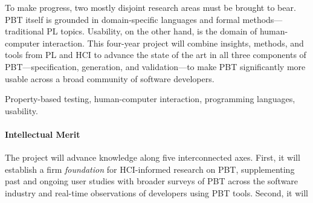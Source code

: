 

To make progress, two mostly disjoint research areas
must be brought to bear.  PBT itself is grounded in domain-specific
languages and formal methods---traditional PL topics.  Usability, on
the other hand, is the domain of human-computer interaction.
%
This four-year project will combine insights, methods, and tools from
PL and HCI to advance the state of the art in all three components of
PBT---specification, generation, and validation---to make PBT
significantly more usable across a broad community of software developers.

\smallskip

 Property-based testing, human-computer
interaction, programming languages, usability.

\paragraph*{Intellectual Merit}
The project will advance knowledge along five interconnected axes.
First, it will establish a firm {\em foundation} for HCI-informed
research on PBT, supplementing past and ongoing user studies with
broader surveys of PBT across the software industry and real-time
observations of developers using PBT tools.  Second, it will 



